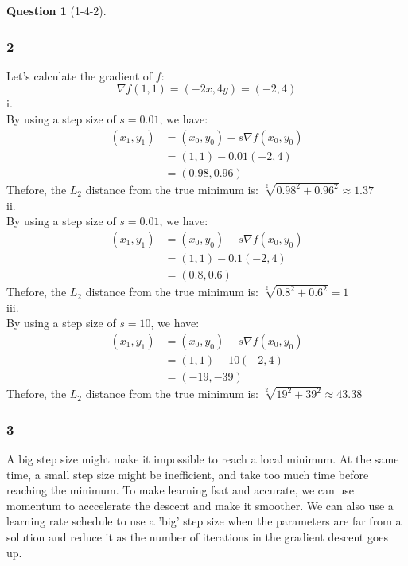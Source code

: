 \documentclass[12pt]{article}
\theoremstyle{definition}
\newtheorem{exercise}{Question}%
\begin{document}
\begin{exercise} [1-4-2]
{\subsubsection*{2}
Let's calculate the gradient of $f$:
\begin{equation*}
  \nabla f (1,1)= (-2x, 4y) =  (-2, 4)
\end{equation*}
i.
\\
By using a step size of $s=0.01$, we have:
\begin{align*}
  (x_{1}, y_{1}) &= (x_{0}, y_{0}) - s \nabla f(x_{0}, y_{0})\\
  &= (1,1) - 0.01 (-2,4)\\
    &= (0.98, 0.96)
\end{align*}
Thefore, the $L_{2}$ distance from the true minimum is:
$\sqrt[2]{0.98^{2} + 0.96^{2}} \approx 1.37$
\\
ii.
\\
By using a step size of $s=0.01$, we have:
\begin{align*}
  (x_{1}, y_{1}) &= (x_{0}, y_{0}) - s \nabla f(x_{0}, y_{0})\\
  &= (1,1) - 0.1 (-2,4)\\
    &= (0.8, 0.6)
\end{align*}
Thefore, the $L_{2}$ distance from the true minimum is:
$\sqrt[2]{0.8^{2}+ 0.6^{2}} = 1$
\\
iii.
\\
By using a step size of $s=10$, we have:
\begin{align*}
  (x_{1}, y_{1}) &= (x_{0}, y_{0}) - s \nabla f(x_{0}, y_{0})\\
  &= (1,1) - 10 (-2,4)\\
    &= (-19, -39)
\end{align*}
Thefore, the $L_{2}$ distance from the true minimum is:
$\sqrt[2]{19^{2}+ 39^{2}} \approx 43.38$
\subsubsection*{3}
A big step size might make it impossible to reach a local minimum. At the same
time, a small step size might be inefficient, and take too much time before
reaching the minimum. To make learning fsat and accurate, we can use momentum to
acccelerate the descent and make it smoother. We can also use a learning rate
schedule to use a 'big' step size when the parameters are far from a solution
and reduce it as the number of iterations in the gradient descent goes up.
}
\end{exercise}
\end{document}
